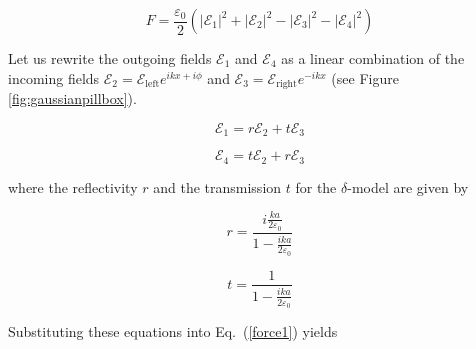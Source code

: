 \begin{equation}
F=\frac{\varepsilon_{0}}{2}\left(\left|\mathcal{E}_{1}\right|^{2}+\left|\mathcal{E}_{2}\right|^{2}-\left|\mathcal{E}_{3}\right|^{2}-\left|\mathcal{E}_{4}\right|^{2}\right)
\label{Gaussianforce}
\end{equation}

Let us rewrite the outgoing fields $\mathcal{E}_{1}$ and $\mathcal{E}_{4}$ as a linear combination of the incoming fields $\mathcal{E}_{2}=\mathcal{E}_{\mathrm{left}}e^{ikx+i\phi}$ 
and $\mathcal{E}_{3}=\mathcal{E}_{\mathrm{right}}e^{-ikx}$ (see Figure \ref{fig:gaussianpillbox}).

\begin{equation}
\mathcal{E}_{1}=r\mathcal{E}_{2}+t\mathcal{E}_{3}
\label{E1}
\end{equation}


\begin{equation}
\mathcal{E}_{4}=t\mathcal{E}_{2}+r\mathcal{E}_{3}
\label{E4}
\end{equation}

where the reflectivity $r$ and the transmission $t$ for the $\delta$-model are given by \cite{us}

\begin{equation}
r=\frac{i\frac{k a}{2\varepsilon_{0}}}{1-\frac{ik a}{2\varepsilon_{0}}}
\label{reflectivity}
\end{equation}


\begin{equation}
t=\frac{1}{1-\frac{ik a}{2\varepsilon_{0}}}
\label{transmission}
\end{equation}

Substituting these equations into Eq.\ (\ref{force1}) yields

